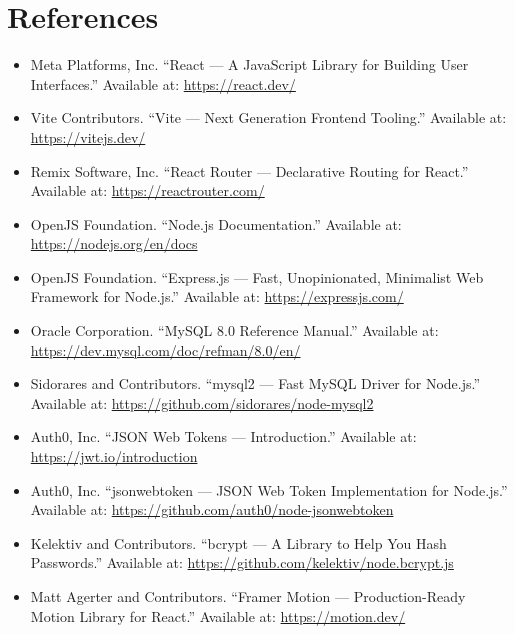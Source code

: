 \chapter{References}

\begin{itemize}

  \item Meta Platforms, Inc. ``React — A JavaScript Library for Building User Interfaces.'' Available at: \url{https://react.dev/}

  \item Vite Contributors. ``Vite — Next Generation Frontend Tooling.'' Available at: \url{https://vitejs.dev/}

  \item Remix Software, Inc. ``React Router — Declarative Routing for React.'' Available at: \url{https://reactrouter.com/}

  \item OpenJS Foundation. ``Node.js Documentation.'' Available at: \url{https://nodejs.org/en/docs}

  \item OpenJS Foundation. ``Express.js — Fast, Unopinionated, Minimalist Web Framework for Node.js.'' Available at: \url{https://expressjs.com/}

  \item Oracle Corporation. ``MySQL 8.0 Reference Manual.'' Available at: \url{https://dev.mysql.com/doc/refman/8.0/en/}

  \item Sidorares and Contributors. ``mysql2 — Fast MySQL Driver for Node.js.'' Available at: \url{https://github.com/sidorares/node-mysql2}

  \item Auth0, Inc. ``JSON Web Tokens — Introduction.'' Available at: \url{https://jwt.io/introduction}

  \item Auth0, Inc. ``jsonwebtoken — JSON Web Token Implementation for Node.js.'' Available at: \url{https://github.com/auth0/node-jsonwebtoken}

  \item Kelektiv and Contributors. ``bcrypt — A Library to Help You Hash Passwords.'' Available at: \url{https://github.com/kelektiv/node.bcrypt.js}

  \item Matt Agerter and Contributors. ``Framer Motion — Production-Ready Motion Library for React.'' Available at: \url{https://motion.dev/}


\end{itemize}
